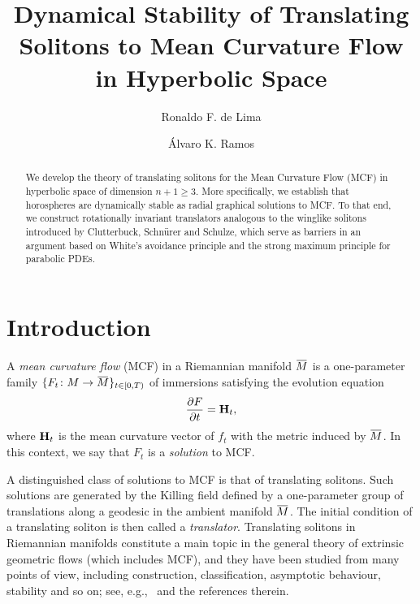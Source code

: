 \documentclass{amsart}[12pt]
\theoremstyle{definition}
\theoremstyle{plain}
\newcommand{\overbar}[1]{\mkern 1.5mu\overline{\mkern-1.5mu#1\mkern-1.5mu}\mkern 1.5mu}
\begin{document}
\title[Dynamical Stability of Translating Solitons]{Dynamical Stability of Translating
Solitons to Mean Curvature Flow in Hyperbolic Space}
\author[R.F. de Lima \and A.K. Ramos]{Ronaldo F. de Lima \and Álvaro K. Ramos}
\address[A1]{Departamento de Matem\'atica - UFRN}
\address[A2]{Departamento de Matemática Pura e Aplicada - UFRGS}

\maketitle

\begin{abstract}
We develop the theory of translating solitons for the Mean
Curvature Flow (MCF) in hyperbolic space of dimension $n+1\ge 3$.
More specifically, we establish that horospheres
are dynamically stable as radial graphical solutions to MCF.
To that end, we construct rotationally invariant
translators analogous to the winglike solitons introduced by
Clutterbuck, Schnürer and Schulze, which serve as barriers in an
argument based on White’s avoidance principle and the
strong maximum principle for parabolic PDEs.


\end{abstract}

\section{Introduction}

A \emph{mean curvature flow} (MCF) in a Riemannian manifold $\overbar M$ is a one-parameter family
$\{
F_t\colon M\to\overbar M
\}_{t\in[0,T)}$
of immersions satisfying the evolution equation
\begin{equation} \label{eq:mcf}
\frac{\partial F}{\partial t}={\rm\bf H}_t,
\end{equation}
where ${\rm\bf H}_t$ is the mean curvature vector of $f_t$ with the metric induced by $\overbar M$.
In this context, we say that $F_t$ is a \emph{solution} to MCF.

A distinguished class of solutions to MCF is that of translating solitons.
Such solutions are generated by the Killing field defined by a one-parameter
group of translations along a geodesic in the ambient manifold $\overbar M$. The initial condition of
a translating soliton is then called a \emph{translator}.
Translating solitons in Riemannian manifolds constitute a main topic in the general theory
of extrinsic geometric flows (which includes MCF), and they have been studied from many points of view,
including construction, classification, asymptotic behaviour, stability and so on;
see, e.g.,~\cite{BL,schulze,DS, dLP,dLRS02,dLRS, EH, G, gs,H,I, LM, P1,P2,SS} and the references therein.
\end{document}
